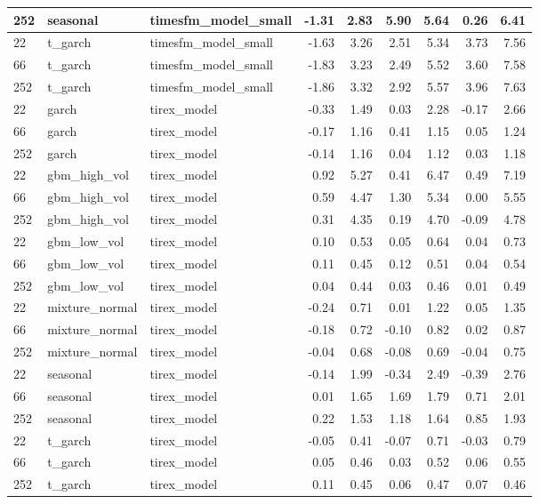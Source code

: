 {\begin{tabular}{lllrrrrrr}
252 & seasonal & timesfm\_model\_small & -1.31 & 2.83 & 5.90 & 5.64 & 0.26 & 6.41 \\
\midrule
22 & t\_garch & timesfm\_model\_small & -1.63 & 3.26 & 2.51 & 5.34 & 3.73 & 7.56 \\
66 & t\_garch & timesfm\_model\_small & -1.83 & 3.23 & 2.49 & 5.52 & 3.60 & 7.58 \\
252 & t\_garch & timesfm\_model\_small & -1.86 & 3.32 & 2.92 & 5.57 & 3.96 & 7.63 \\
\midrule
22 & garch & tirex\_model & -0.33 & 1.49 & 0.03 & 2.28 & -0.17 & 2.66 \\
66 & garch & tirex\_model & -0.17 & 1.16 & 0.41 & 1.15 & 0.05 & 1.24 \\
252 & garch & tirex\_model & -0.14 & 1.16 & 0.04 & 1.12 & 0.03 & 1.18 \\
\midrule
22 & gbm\_high\_vol & tirex\_model & 0.92 & 5.27 & 0.41 & 6.47 & 0.49 & 7.19 \\
66 & gbm\_high\_vol & tirex\_model & 0.59 & 4.47 & 1.30 & 5.34 & 0.00 & 5.55 \\
252 & gbm\_high\_vol & tirex\_model & 0.31 & 4.35 & 0.19 & 4.70 & -0.09 & 4.78 \\
\midrule
22 & gbm\_low\_vol & tirex\_model & 0.10 & 0.53 & 0.05 & 0.64 & 0.04 & 0.73 \\
66 & gbm\_low\_vol & tirex\_model & 0.11 & 0.45 & 0.12 & 0.51 & 0.04 & 0.54 \\
252 & gbm\_low\_vol & tirex\_model & 0.04 & 0.44 & 0.03 & 0.46 & 0.01 & 0.49 \\
\midrule
22 & mixture\_normal & tirex\_model & -0.24 & 0.71 & 0.01 & 1.22 & 0.05 & 1.35 \\
66 & mixture\_normal & tirex\_model & -0.18 & 0.72 & -0.10 & 0.82 & 0.02 & 0.87 \\
252 & mixture\_normal & tirex\_model & -0.04 & 0.68 & -0.08 & 0.69 & -0.04 & 0.75 \\
\midrule
22 & seasonal & tirex\_model & -0.14 & 1.99 & -0.34 & 2.49 & -0.39 & 2.76 \\
66 & seasonal & tirex\_model & 0.01 & 1.65 & 1.69 & 1.79 & 0.71 & 2.01 \\
252 & seasonal & tirex\_model & 0.22 & 1.53 & 1.18 & 1.64 & 0.85 & 1.93 \\
\midrule
22 & t\_garch & tirex\_model & -0.05 & 0.41 & -0.07 & 0.71 & -0.03 & 0.79 \\
66 & t\_garch & tirex\_model & 0.05 & 0.46 & 0.03 & 0.52 & 0.06 & 0.55 \\
252 & t\_garch & tirex\_model & 0.11 & 0.45 & 0.06 & 0.47 & 0.07 & 0.46 \\

\end{tabular}}
